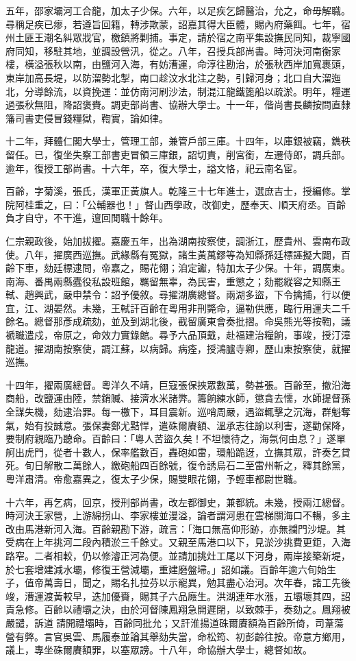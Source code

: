 \begin{pinyinscope}
五年，邵家壩河工合龍，加太子少保。六年，以足疾乞歸醫治，允之，命毋解職。尋稱足疾已瘳，若遵旨回籍，轉涉欺蒙，詔嘉其得大臣體，賜內府藥餌。七年，宿州土匪王潮名糾眾戕官，檄鎮將剿捕。事定，請於宿之南平集設撫民同知，裁寧國府同知，移駐其地，並調設營汛，從之。八年，召授兵部尚書。時河決河南衡家樓，橫溢張秋以南，由鹽河入海，有妨漕運，命淳往勘治，於張秋西岸加寬裹頭，東岸加高長堤，以防溜勢北掣，南口趁汶水北注之勢，引歸河身；北口自大溜迤北，分導餘流，以資挽運：並仿南河刷沙法，制混江龍鐵篦船以疏淤。明年，糧運過張秋無阻，降詔褒賚。調吏部尚書、協辦大學士。十一年，偕尚書長麟按問直隸籓司書吏侵冒錢糧獄，鞫實，論如律。

十二年，拜體仁閣大學士，管理工部，兼管戶部三庫。十四年，以庫銀被竊，鐫秩留任。已，復坐失察工部書吏冒領三庫銀，詔切責，削宮銜，左遷侍郎，調兵部。逾年，復授工部尚書。十六年，卒，復大學士，謚文恪，祀云南名宦。

百齡，字菊溪，張氏，漢軍正黃旗人。乾隆三十七年進士，選庶吉士，授編修。掌院阿桂重之，曰：「公輔器也！」督山西學政，改御史，歷奉天、順天府丞。百齡負才自守，不干進，邅回閒職十餘年。

仁宗親政後，始加拔擢。嘉慶五年，出為湖南按察使，調浙江，歷貴州、雲南布政使。八年，擢廣西巡撫。武緣縣有冤獄，諸生黃萬鏐等為知縣孫廷標誣擬大闢，百齡下車，劾廷標逮問，帝嘉之，賜花翎；洎定讞，特加太子少保。十年，調廣東。南海、番禺兩縣蠹役私設班館，羈留無辜，為民害，重懲之；劾罷縱容之知縣王軾、趙興武，嚴申禁令：詔予優敘。尋擢湖廣總督。兩湖多盜，下令擒捕，行以便宜，江、湖晏然。未幾，王軾訐百齡在粵用非刑斃命，逼勒供應，臨行用運夫二千餘名。總督那彥成疏劾，並及到湖北後，截留廣東會奏批摺。命吳熊光等按鞫，議褫職遣戍，帝原之，命效力實錄館。尋予六品頂戴，赴福建治糧餉，事竣，授汀漳龍道。擢湖南按察使，調江蘇，以病歸。病痊，授鴻臚寺卿，歷山東按察使，就擢巡撫。

十四年，擢兩廣總督。粵洋久不靖，巨寇張保挾眾數萬，勢甚張。百齡至，撤沿海商船，改鹽運由陸，禁銷贓、接濟水米諸弊。籌餉練水師，懲貪去懦，水師提督孫全謀失機，劾逮治罪。每一檄下，耳目震新。巡哨周嚴，遇盜輒擊之沉海，群魁奪氣，始有投誠意。張保妻鄭尤黠悍，遣硃爾賡額、溫承志往諭以利害，遂勸保降，要制府親臨乃聽命。百齡曰：「粵人苦盜久矣！不坦懷待之，海氛何由息？」遂單舸出虎門，從者十數人，保率艦數百，轟砲如雷，環船跪迓，立撫其眾，許奏乞貸死。旬日解散二萬餘人，繳砲船四百餘號，復令誘烏石二至雷州斬之，釋其餘黨，粵洋肅清。帝愈嘉異之，復太子少保，賜雙眼花翎，予輕車都尉世職。

十六年，再乞病，回京，授刑部尚書，改左都御史，兼都統。未幾，授兩江總督。時河決王家營，上游綿拐山、李家樓並漫溢，論者謂河患在雲梯關海口不暢，多主改由馬港新河入海。百齡親勘下游，疏言：「海口無高仰形跡，亦無攔門沙堤。其受病在上年挑河二段內積淤三千餘丈。又親至馬港口以下，見淤沙挑費更鉅，入海路窄。二者相較，仍以修濬正河為便。並請加挑灶工尾以下河身，兩岸接築新堤，於七套增建減水壩，修復王營減壩，重建磨盤埽。」詔如議。百齡年逾六旬始生子，值帝萬壽日，聞之，賜名扎拉芬以示寵異，勉其盡心治河。次年春，諸工先後竣，漕運渡黃較早，迭加優賚，賜其子六品廕生。洪湖連年水漲，五壩壞其四，詔責急修。百齡以禮壩之決，由於河督陳鳳翔急開遲閉，以致棘手，奏劾之。鳳翔被嚴譴，訴道請開禮壩時，百齡同批允；又訐淮揚道硃爾賡額為百齡所倚，司葦蕩營有弊。言官吳雲、馬履泰並論其舉劾失當，命松筠、初彭齡往按。帝意方鄉用，議上，專坐硃爾賡額罪，以塞眾謗。十八年，命協辦大學士，總督如故。


\end{pinyinscope}
